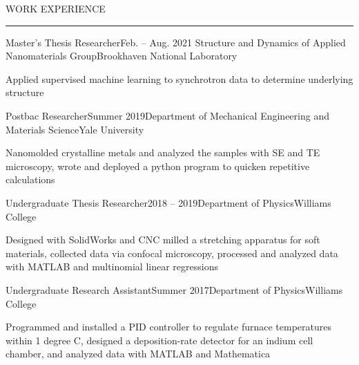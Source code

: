 \documentclass{short_resume} %
\renewenvironment{rSection}[1]{
	\sectionskip
	\textcolor{RoyalPurple}{\MakeUppercase{#1}}
	\sectionlineskip
	\hrule
	\begin{list}{}{
			\setlength{\leftmargin}{1.5em}
		}
		\item[]
	}{
	\end{list}
}
\begin{document}
\vspace{-1em}		
	\begin{rSection}{Work Experience}
			\begin{rSubsection}{Master's Thesis Researcher}{Feb. -- Aug. 2021}{ Structure and Dynamics of Applied Nanomaterials Group}{Brookhaven National Laboratory}
			\item[] Applied supervised machine learning to synchrotron data to determine underlying structure
			\vspace{-.2em}
		\end{rSubsection}
		\vspace{-.2em}
		\begin{rSubsection}{Postbac Researcher}{Summer 2019}{Department of Mechanical Engineering and Materials Science}{Yale University}
			\item[] Nanomolded crystalline metals and analyzed the samples with SE and TE microscopy, wrote and deployed a python program to quicken repetitive calculations 
			\vspace{-.2em}
		\end{rSubsection}
		\vspace{-.2em}
		\begin{rSubsection}{Undergraduate Thesis Researcher}{2018 -- 2019}{Department of Physics}{Williams College}
			\item[] Designed with SolidWorks and CNC milled a stretching apparatus for soft materials, collected data via confocal microscopy, processed and analyzed data with MATLAB and multinomial linear regressions
		\end{rSubsection}
		\vspace{-.2em}
		\begin{rSubsection}{Undergraduate Research Assistant}{Summer 2017}{Department of Physics}{Williams College}
			\item[] Programmed and installed a PID controller to regulate furnace temperatures within 1 degree C, designed a deposition-rate detector for an indium cell chamber, and analyzed data with MATLAB and Mathematica
		\end{rSubsection}


\end{rSection}
\end{document}
